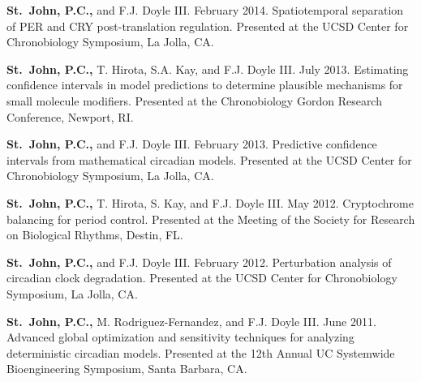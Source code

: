 {{\bfseries St.\ John, P.C.,} and F.J. Doyle III. February 2014. Spatiotemporal
separation of PER and CRY post-translation regulation. Presented at the UCSD
Center for Chronobiology Symposium, La Jolla, CA.

{\bfseries St.\ John, P.C.,} T. Hirota, S.A. Kay, and F.J. Doyle III. July 2013. Estimating confidence intervals in model predictions to determine plausible mechanisms for small molecule modifiers. Presented at the Chronobiology Gordon Research Conference, Newport, RI.

{\bfseries St.\ John, P.C.,} and F.J. Doyle III. February 2013. Predictive confidence intervals from mathematical circadian models. Presented at the UCSD Center for Chronobiology Symposium, La Jolla, CA.


{\bfseries St.\ John, P.C.,} T. Hirota, S. Kay, and F.J. Doyle III. May 2012. Cryptochrome balancing for period control. Presented at the Meeting of the Society for Research on Biological Rhythms, Destin, FL.

{\bfseries St.\ John, P.C.,} and F.J. Doyle III. February 2012. Perturbation analysis of circadian clock degradation. Presented at the UCSD Center for Chronobiology Symposium, La Jolla, CA.

{\bfseries St.\ John, P.C.,} M. Rodriguez-Fernandez, and F.J. Doyle III.  June 2011. Advanced global optimization and sensitivity techniques for analyzing deterministic circadian models. Presented at the 12th Annual UC Systemwide Bioengineering Symposium, Santa Barbara, CA.





}
